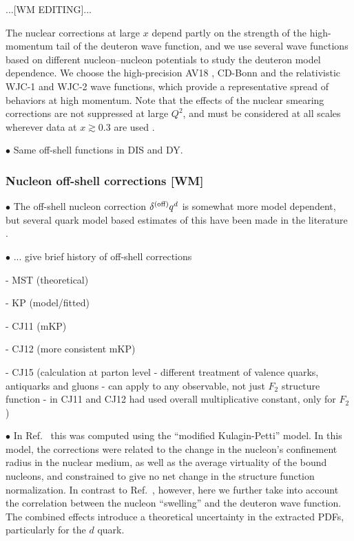 \documentclass[aps,prd,amsmath,preprint]{revtex4}
\begin{document}
{\color{red} ...[WM EDITING]...}


The nuclear corrections at large $x$ depend partly on the strength
of the high-momentum tail of the deuteron wave function, and we use
several wave functions based on different nucleon--nucleon potentials
to study the deuteron model dependence.  We choose the high-precision
AV18 \cite{AV18}, CD-Bonn \cite{CDBonn} and the relativistic WJC-1
and WJC-2 \cite{WJC} wave functions, which provide a representative
spread of behaviors at high momentum.
Note that the effects of the nuclear smearing corrections are not
suppressed at large $Q^2$, and must be considered at all scales
wherever data at $x \gtrsim 0.3$ are used \cite{CJ10, ACHL09, ARM12}.


$\bullet$
Same off-shell functions in DIS and DY.



\subsubsection{Nucleon off-shell corrections {\color{red} [WM]}}
\label{sssec:offshell}


$\bullet$
The off-shell nucleon correction $\delta^{(\rm off)} q^d$ is somewhat
more model dependent, but several quark model based estimates of this
have been made in the literature \cite{KP06, GL92, MSTplb}.


$\bullet$
... give brief history of off-shell corrections

- MST (theoretical)

- KP (model/fitted)

- CJ11 (mKP)

- CJ12 (more consistent mKP)

- CJ15 (calculation at parton level - different treatment of 
  valence quarks, antiquarks and gluons - can apply to any
  observable, not just $F_2$ structure function - in CJ11 and CJ12
  had used overall multiplicative constant, only for $F_2$)



$\bullet$
In Ref.~\cite{CJ11} this was computed using the ``modified Kulagin-Petti''
model.
In this model, the corrections were related to the change in the
nucleon's confinement radius in the nuclear medium, as well as the
average virtuality of the bound nucleons, and constrained to give no
net change in the structure function normalization.  In contrast to
Ref.~\cite{CJ11}, however, here we further take into account the
correlation between the nucleon ``swelling'' and the deuteron wave
function.  The combined effects introduce a theoretical uncertainty
in the extracted PDFs, particularly for the $d$ quark. 
\end{document}
